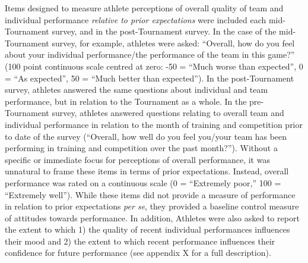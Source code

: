 Items designed to measure athlete perceptions of overall quality of team and individual performance \textit{relative to prior expectations} were included each mid-Tournament survey, and in the post-Tournament survey.  In the case of the mid-Tournament survey, for example, athletes were asked: ``Overall, how do you feel about your individual performance/the performance of the team in this game?'' (100 point continuous scale centred at zero: -50 = ``Much worse than expected'', 0 =  ``As expected'', 50 =  ``Much better than expected''). In the post-Tournament survey, athletes answered the same questions about individual and team performance, but in relation to the Tournament as a whole. In the pre-Tournament survey, athletes answered questions relating to overall team and individual performance in relation to the month of training and competition prior to date of the survey (``Overall, how well do you feel you/your team has been performing in training and competition over the past month?'').  Without a specific or immediate focus for perceptions of overall performance, it was unnatural to frame these items in terms of prior expectations.  Instead, overall performance was rated on a continuous scale (0 = ``Extremely poor,'' 100 = ``Extremely well'').  While these items did not provide a measure of performance in relation to prior expectations \textit{per se}, they provided a baseline control measure of attitudes towards performance.  In addition, Athletes were also asked to report the extent to which 1) the quality of recent individual performances influences their mood and 2) the extent to which recent performance influences their confidence for future performance (see appendix X for a full description).


